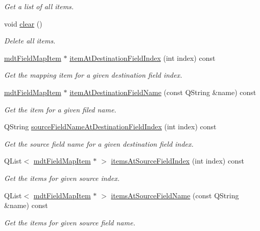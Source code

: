 \begin{DoxyCompactItemize}
\begin{DoxyCompactList}\small\item\em Get a list of all items. \end{DoxyCompactList}\item 
void \hyperlink{classmdt_field_map_ac7b6c8d9467614a9b9f72c5a504f74fe}{clear} ()
\begin{DoxyCompactList}\small\item\em Delete all items. \end{DoxyCompactList}\item 
\hyperlink{classmdt_field_map_item}{mdtFieldMapItem} $\ast$ \hyperlink{classmdt_field_map_a64dceefe9255c27db01c2a9f72024725}{itemAtDestinationFieldIndex} (int index) const 
\begin{DoxyCompactList}\small\item\em Get the mapping item for a given destination field index. \end{DoxyCompactList}\item 
\hyperlink{classmdt_field_map_item}{mdtFieldMapItem} $\ast$ \hyperlink{classmdt_field_map_a8602e13e3294e834324305a1d65cc8dd}{itemAtDestinationFieldName} (const QString \&name) const 
\begin{DoxyCompactList}\small\item\em Get the item for a given filed name. \end{DoxyCompactList}\item 
QString \hyperlink{classmdt_field_map_ad0a700ed332b2b73e1b28533d35ad344}{sourceFieldNameAtDestinationFieldIndex} (int index) const 
\begin{DoxyCompactList}\small\item\em Get the source field name for a given destination field index. \end{DoxyCompactList}\item 
QList$<$ \hyperlink{classmdt_field_map_item}{mdtFieldMapItem} $\ast$ $>$ \hyperlink{classmdt_field_map_ad0d7d88a3d262b48744cfe564b2bf37d}{itemsAtSourceFieldIndex} (int index) const 
\begin{DoxyCompactList}\small\item\em Get the items for given source index. \end{DoxyCompactList}\item 
QList$<$ \hyperlink{classmdt_field_map_item}{mdtFieldMapItem} $\ast$ $>$ \hyperlink{classmdt_field_map_a30fb87695d60cc2d1212def4530fe3f6}{itemsAtSourceFieldName} (const QString \&name) const 
\begin{DoxyCompactList}\small\item\em Get the items for given source field name. \end{DoxyCompactList}\item 

\end{DoxyCompactItemize}

